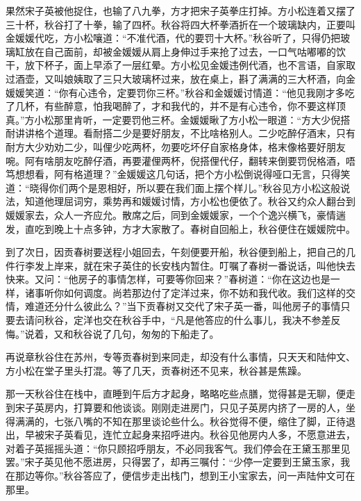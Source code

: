 \documentclass[12pt,UTF8]{ctexbook}
\begin{document}
{{{果然宋子英被他捉住，也输了八九拳，方才把宋子英拳庄打掉。方小松连着又摆了三十杯，秋谷打了十拳，输了四杯。秋谷将四大杯拳酒折在一个玻璃缺内，正要叫金媛媛代吃，方小松嚷道：“不准代酒，代的要罚十大杯。”秋谷听了，只得仍把玻璃缸放在自己面前，却被金媛媛从肩上身伸过手来抢了过去，一口气咕嘟嘟的饮干，放下杯子，面上早添了一层红晕。方小松见金媛违例代酒，也不言语，自家取过酒壶，又叫娘姨取了三只大玻璃杯过来，放在桌上，斟了满满的三大杯酒，向金媛媛笑道：“你有心违令，定要罚你三杯。”秋谷和金媛媛讨情道：“他见我刚才多吃了几杯，有些醉意，怕我喝醉了，才和我代的，并不是有心违令，你不要这样顶真。”方小松那里肯听，一定要罚他三杯。金媛媛瞅了方小松一眼道：“方大少倪搭耐讲讲格个道理。看耐搭二少是要好朋友，不比啥格别人。二少吃醉仔酒末，只有耐方大少劝劝二少，叫俚少吃两杯，勿要吃坏仔自家格身体，格末像格要好朋友啘。阿有啥朋友吃醉仔酒，再要灌俚两杯，倪搭俚代仔，翻转来倒要罚倪格酒，唔笃想想看，阿有格道理？”金媛媛这几句话，把个方小松倒说得哑口无言，只得笑道：“晓得你们两个是恩相好，所以要在我们面上摆个样儿。”秋谷见方小松这般说法，知道他理屈词穷，乘势再和媛媛讨情，方小松也便依了。秋谷又约众人翻台到媛媛家去，众人一齐应允。散席之后，同到金媛媛家，一个个逸兴横飞，豪情遄发，直吃到晚上十点多钟，方才大家散了。春树自回船上，秋谷便住在媛媛院中。

到了次日，因贡春树要送程小姐回去，午刻便要开船，秋谷便到船上，把自己的几件行李发上岸来，就在宋子英住的长安栈内暂住。叮嘱了春树一番说话，叫他快去快来。又问：“他房子的事情怎样，可要等你回来？”春树道：“你在这边也是一样，诸事听你如何调度。尚若那边付了定洋过来，你不妨和我代收。我们这样的交情，难道还分什么彼此么？”当下贡春树又交代了宋子英一番，叫他房子的事情只要去请问秋谷，定洋也交在秋谷手中，“凡是他答应的什么事儿，我决不参差反悔。”说着，又和秋谷说了几句，匆匆的下船走了。

再说章秋谷住在苏州，专等贡春树到来同走，却没有什么事情，只天天和陆仲文、方小松在堂子里头打混。等了几天，贡春树还不见来，秋谷甚是焦躁。

那一天秋谷住在栈中，直睡到午后方才起身，略略吃些点膳，觉得甚是无聊，便走到宋子英房内，打算要和他谈谈。刚刚走进房门，只见子英房内挤了一房的人，坐得满满的，七张八嘴的不知在那里谈论些什么。秋谷觉得不便，缩住了脚，正待退出，早被宋子英看见，连忙立起身来招呼进内。秋谷见他房内人多，不愿意进去，对着子英摇摇头道：“你只顾招呼朋友，不必同我客气。我们停会在王黛玉那里见罢。”宋子英见他不愿进房，只得罢了，却再三嘱付：“少停一定要到王黛玉家，我在那边等你。”秋谷答应了，便信步走出栈门，想到王小宝家去，问一声陆仲文可在那里。

}}}
\end{document}

